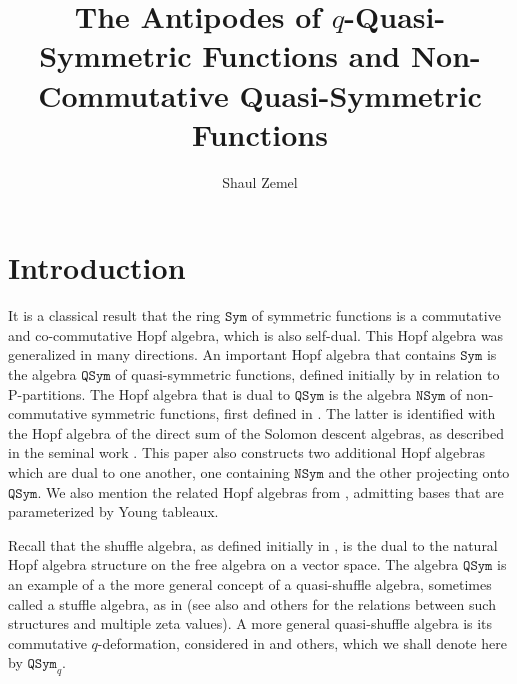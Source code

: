 \documentclass{article}
\theoremstyle{definition}
\begin{document}
\title{The Antipodes of $q$-Quasi-Symmetric Functions and Non-Commutative Quasi-Symmetric Functions}

\author{Shaul Zemel}

\maketitle

\begin{abstract}

\end{abstract}

\section*{Introduction}

It is a classical result that the ring $\mathtt{Sym}$ of symmetric functions is a commutative and co-commutative Hopf algebra, which is also self-dual. This Hopf algebra was generalized in many directions. An important Hopf algebra that contains $\mathtt{Sym}$ is the algebra $\mathtt{QSym}$ of quasi-symmetric functions, defined initially by \cite{[Ge]} in relation to P-partitions. The Hopf algebra that is dual to $\mathtt{QSym}$ is the algebra $\mathtt{NSym}$ of non-commutative symmetric functions, first defined in \cite{[GKLLRT]}. The latter is identified with the Hopf algebra of the direct sum of the Solomon descent algebras, as described in the seminal work \cite{[MR]}. This paper also constructs two additional Hopf algebras which are dual to one another, one containing $\mathtt{NSym}$ and the other projecting onto $\mathtt{QSym}$. We also mention the related Hopf algebras from \cite{[PR]}, admitting bases that are parameterized by Young tableaux.

Recall that the shuffle algebra, as defined initially in \cite{[R]}, is the dual to the natural Hopf algebra structure on the free algebra on a vector space. The algebra $\mathtt{QSym}$ is an example of a the more general concept of a quasi-shuffle algebra, sometimes called a stuffle algebra, as in \cite{[Ho1]} (see also \cite{[Ho2]} and others for the relations between such structures and multiple zeta values). A more general quasi-shuffle algebra is its commutative $q$-deformation, considered in \cite{[BDM]} and others, which we shall denote here by $\mathtt{QSym}_{q}$.
\end{document}
